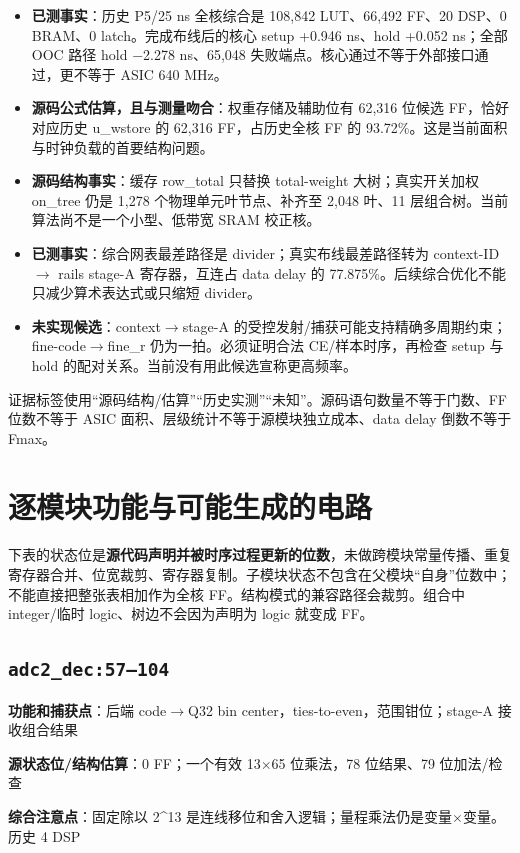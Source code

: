 \documentclass[UTF8,fontset=fandol,10pt,a4paper,openany]{ctexrep}
\newcommand{\code}[1]{\nolinkurl{#1}}
\begin{document}
\begin{itemize}
\item \textbf{已测事实}：历史 P5/25 ns 全核综合是 108,842 LUT、66,492 FF、20 DSP、0 BRAM、0 latch。完成布线后的核心 setup +0.946 ns、hold +0.052 ns；全部 OOC 路径 hold \ensuremath{-}2.278 ns、65,048 失败端点。核心通过不等于外部接口通过，更不等于 ASIC 640 MHz。
\item \textbf{源码公式估算，且与测量吻合}：权重存储及辅助位有 62,316 位候选 FF，恰好对应历史 u\_wstore 的 62,316 FF，占历史全核 FF 的 93.72\%。这是当前面积与时钟负载的首要结构问题。
\item \textbf{源码结构事实}：缓存 row\_total 只替换 total-weight 大树；真实开关加权 on\_tree 仍是 1,278 个物理单元叶节点、补齐至 2,048 叶、11 层组合树。当前算法尚不是一个小型、低带宽 SRAM 校正核。
\item \textbf{已测事实}：综合网表最差路径是 divider；真实布线最差路径转为 context-ID \ensuremath{\rightarrow} rails stage-A 寄存器，互连占 data delay 的 77.875\%。后续综合优化不能只减少算术表达式或只缩短 divider。
\item \textbf{未实现候选}：context\ensuremath{\rightarrow}stage-A 的受控发射/捕获可能支持精确多周期约束；fine-code\ensuremath{\rightarrow}fine\_r 仍为一拍。必须证明合法 CE/样本时序，再检查 setup 与 hold 的配对关系。当前没有用此候选宣称更高频率。
\end{itemize}


证据标签使用“源码结构/估算”“历史实测”“未知”。源码语句数量不等于门数、FF 位数不等于 ASIC 面积、层级统计不等于源模块独立成本、data delay 倒数不等于 Fmax。


\section{逐模块功能与可能生成的电路}


下表的状态位是\textbf{源代码声明并被时序过程更新的位数}，未做跨模块常量传播、重复寄存器合并、位宽裁剪、寄存器复制。子模块状态不包含在父模块“自身”位数中；不能直接把整张表相加作为全核 FF。结构模式的兼容路径会裁剪。组合中 integer/临时 logic、树边不会因为声明为 logic 就变成 FF。


\subsection*{\code{adc2_dec:57–104}}
\noindent\textbf{功能和捕获点}：后端 code\ensuremath{\rightarrow}Q32 bin center，ties-to-even，范围钳位；stage-A 接收组合结果\par
\noindent\textbf{源状态位/结构估算}：0 FF；一个有效 13\ensuremath{\times}65 位乘法，78 位结果、79 位加法/检查\par
\noindent\textbf{综合注意点}：固定除以 2\textasciicircum{}13 是连线移位和舍入逻辑；量程乘法仍是变量\ensuremath{\times}变量。历史 4 DSP\par
\end{document}
